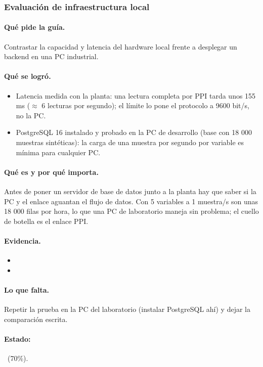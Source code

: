 \documentclass[a4paper,11pt]{article}
\begin{document}
\subsubsection{Evaluación de infraestructura local}
\paragraph{Qué pide la guía.} Contrastar la capacidad y latencia del hardware local frente a desplegar un backend en una PC industrial.
\paragraph{Qué se logró.}
\begin{itemize}
\item Latencia medida con la planta: una lectura completa por PPI tarda unos 155 ms ($\approx$ 6 lecturas por segundo); el límite lo pone el protocolo a 9600 bit/s, no la PC.
\item PostgreSQL 16 instalado y probado en la PC de desarrollo (base  con 18 000 muestras sintéticas): la carga de una muestra por segundo por variable es mínima para cualquier PC.
\end{itemize}
\paragraph{Qué es y por qué importa.} Antes de poner un servidor de base de datos junto a la planta hay que saber si la PC y el enlace aguantan el flujo de datos. Con 5 variables a 1 muestra/s son unas 18 000 filas por hora, lo que una PC de laboratorio maneja sin problema; el cuello de botella es el enlace PPI.
\paragraph{Evidencia.}
\begin{itemize}\small
\item {}
\item {}
\end{itemize}
\paragraph{Lo que falta.} Repetir la prueba en la PC del laboratorio (instalar PostgreSQL ahí) y dejar la comparación escrita.
\paragraph{Estado:} \parcial~(70\%).
\end{document}
